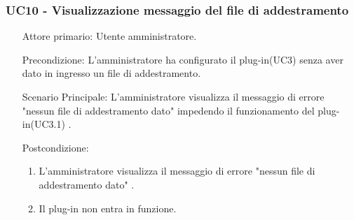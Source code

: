 \subsubsection{UC10 - Visualizzazione messaggio del file di addestramento}
\label{sssec:uc10}
\begin{description}
	\begin{enumerate}
		\item[Attore primario:] Utente amministratore.
		\item[Precondizione:] L'amministratore ha configurato il plug-in(UC3) senza aver dato in ingresso un file di addestramento.
		\item[Scenario Principale:] L'amministratore visualizza il messaggio di errore "nessun file di addestramento dato" impedendo il funzionamento del plug-in(UC3.1) .
		\item[Postcondizione:]
		\begin{enumerate}
			\item L'amministratore visualizza il messaggio di errore "nessun file di addestramento dato" .
			\item Il plug-in non entra in funzione.
		\end{enumerate}
	\end{enumerate}
\end{description}